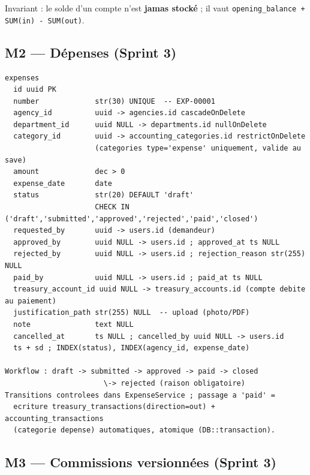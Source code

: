 \documentclass[11pt,a4paper]{article}
\begin{document}
Invariant : le solde d'un compte n'est \textbf{jamas stocké} ; il vaut \verb|opening_balance + SUM(in) - SUM(out)|.

\subsection{M2 --- Dépenses (Sprint 3)}

\begin{lstlisting}
expenses
  id uuid PK
  number             str(30) UNIQUE  -- EXP-00001
  agency_id          uuid -> agencies.id cascadeOnDelete
  department_id      uuid NULL -> departments.id nullOnDelete
  category_id        uuid -> accounting_categories.id restrictOnDelete
                     (categories type='expense' uniquement, valide au save)
  amount             dec > 0
  expense_date       date
  status             str(20) DEFAULT 'draft'
                     CHECK IN ('draft','submitted','approved','rejected','paid','closed')
  requested_by       uuid -> users.id (demandeur)
  approved_by        uuid NULL -> users.id ; approved_at ts NULL
  rejected_by        uuid NULL -> users.id ; rejection_reason str(255) NULL
  paid_by            uuid NULL -> users.id ; paid_at ts NULL
  treasury_account_id uuid NULL -> treasury_accounts.id (compte debite au paiement)
  justification_path str(255) NULL  -- upload (photo/PDF)
  note               text NULL
  cancelled_at       ts NULL ; cancelled_by uuid NULL -> users.id
  ts + sd ; INDEX(status), INDEX(agency_id, expense_date)

Workflow : draft -> submitted -> approved -> paid -> closed
                       \-> rejected (raison obligatoire)
Transitions controlees dans ExpenseService ; passage a 'paid' =
  ecriture treasury_transactions(direction=out) + accounting_transactions
  (categorie depense) automatiques, atomique (DB::transaction).
\end{lstlisting}

\subsection{M3 --- Commissions versionnées (Sprint 3)}
\end{document}
